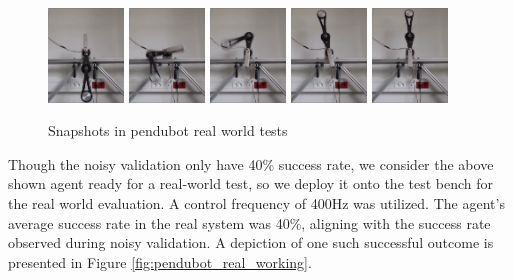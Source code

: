 \begin{figure}[H]
    \centering
    \includegraphics[width=0.18\textwidth]{figures/pendubot_real_snapshot/1.png}
    \includegraphics[width=0.18\textwidth]{figures/pendubot_real_snapshot/2.png}
    \includegraphics[width=0.18\textwidth]{figures/pendubot_real_snapshot/3.png}
    \includegraphics[width=0.18\textwidth]{figures/pendubot_real_snapshot/4.png}
    \includegraphics[width=0.18\textwidth]{figures/pendubot_real_snapshot/5.png}
    \caption{Snapshots in pendubot real world tests}
    \label{fig:pendubot_real_snapshot}
\end{figure}

Though the noisy validation only have 40\% success rate, we consider the above shown agent ready for a real-world test, so we deploy it onto the test bench for the real world evaluation. A control frequency of 400Hz was utilized. The agent's average success rate in the real system was 40\%, aligning with the success rate observed during noisy validation. A depiction of one such successful outcome is presented in Figure \ref{fig:pendubot_real_working}. 

